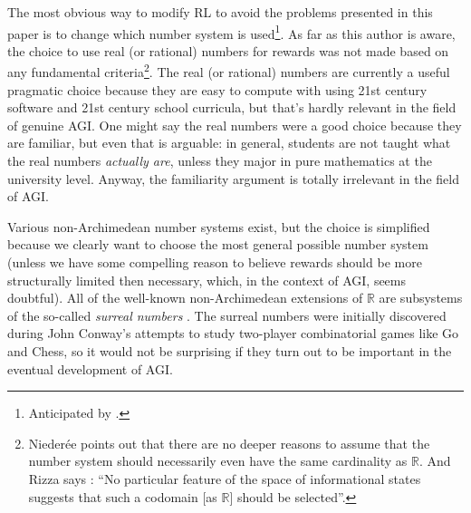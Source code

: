 \documentclass[reqno]{article}
\theoremstyle{definition}
\begin{document}
The most obvious way to modify RL to avoid the problems presented in this
paper is to change which number system is used\footnote{Anticipated
by \cite{rizza2016divergent}.}.
As far as this author is aware,
the choice to use real (or rational) numbers for rewards was not made based
on any fundamental criteria\footnote{Nieder{\'e}e points out
\cite{niederee1992numbers} that there are
no deeper reasons to assume that the number system should necessarily
even have the same cardinality as $\mathbb R$. And Rizza says
\cite{rizza2016divergent}: ``No particular feature of the space of informational
states suggests that such a codomain [as $\mathbb R$] should be selected''.}. The real
(or rational) numbers are currently a
useful pragmatic choice because they are easy to compute with using 21st
century software and 21st century school curricula, but that's hardly relevant
in the field of genuine AGI. One might
say the real numbers were a good choice because they are familiar, but even
that is arguable: in general, students are not taught what the
real numbers \emph{actually are},
unless they major in pure mathematics at the university level. Anyway,
the familiarity argument is totally irrelevant in the field of AGI.

Various non-Archimedean
number systems exist, but the choice is simplified because we clearly want
to choose the most general possible number system (unless we have
some compelling reason to believe rewards should be more structurally limited
then necessary, which, in the context of AGI, seems doubtful). All of the
well-known non-Archimedean extensions of $\mathbb R$ are subsystems of the
so-called \emph{surreal numbers} \cite{conway} \cite{knuth}. The surreal
numbers were initially discovered during John Conway's attempts to study
two-player combinatorial games like Go and Chess, so it would not be
surprising if they turn out to be important in the eventual development of
AGI.

\end{document}
